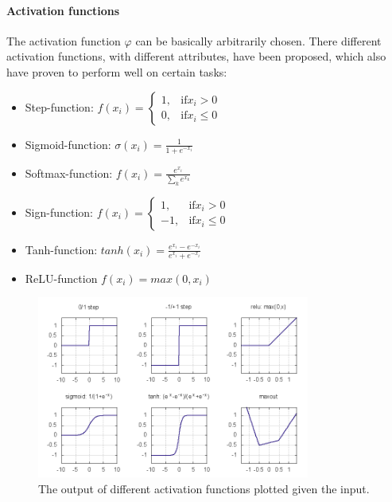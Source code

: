 \paragraph{Activation functions}

The activation function $\varphi$ can be basically arbitrarily chosen. 
There different activation functions, with different attributes, have been proposed, which also have proven to perform well on certain tasks:

\begin{itemize}
	\item Step-function: $f(x_i) = \begin{cases} 1, & \text{if} x_i > 0 \\ 0, & \text{if} x_i \le 0  \end{cases}$
	\item Sigmoid-function: $\sigma(x_i) = \frac{1}{1 + e^{-x_i}}$ 
	\item Softmax-function: $f(x_i) = \frac{e^{x_i}}{\sum_k e^{x_k}}$ 
	\item Sign-function: $f(x_i) = \begin{cases} 1, & \text{if} x_i > 0 \\ -1, & \text{if} x_i \le 0  \end{cases}$
	\item Tanh-function: $tanh(x_i) = \frac{e^{x_i} - e^{-x_i}}{e^{x_i} + e^{-x_i}}$
	\item ReLU-function $f(x_i) = max(0, x_i)$
\end{itemize}

\begin{figure}
	\centering
    	\includegraphics[width=0.8\textwidth]{imgs/act_fun.png} 
    \caption{The output of different activation functions plotted given the input.}
	\label{fig:activations}
\end{figure}

